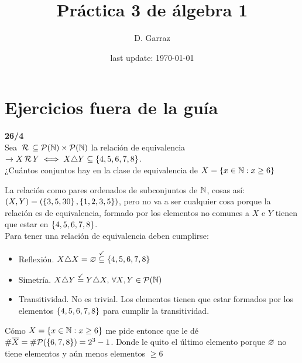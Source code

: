 \documentclass[12pt,a4paper, spanish]{article}
\begin{document}
\pagestyle{empty} %

\title{Práctica 3 de álgebra 1} %
\author{D. Garraz} %
\date{last update: \today} %
\section*{Ejercicios fuera de la guía}
\textbf{26/4}\\
Sea $\,\mathcal{R}\, \subseteq \mathcal P(\mathbb N) \times \mathcal P(\mathbb N)$ la relación de equivalencia $\to X \,\mathcal{R}\, Y \iff X \triangle Y \subseteq \left\{ 4,5,6,7,8 \right\}$.\\
¿Cuántos conjuntos hay en la clase de equivalencia de $X = \left\{ x \in \mathbb N : x \geq 6 \right\}$

\separadorCorto
La relación como pares ordenados de subconjuntos de $\mathbb N$, cosas así: $ (X,Y) = \left(  \left\{ 3, 5, 30 \right\}, \left\{ 1,2,3,5 \right\}  \right)$, pero no va a ser cualquier cosa
porque la relación es de equivalencia, formado por los elementos no comunes a $X$ e $Y$ tienen que estar en $\left\{ 4,5,6,7,8 \right\}$.\\
Para tener una relación de equivalencia deben cumplirse:

\begin{itemize}
	\item Reflexión. $X \triangle X = \varnothing \stackrel{\checkmark}\subseteq \left\{ 4,5,6,7,8 \right\}$

	\item Simetría. $X \triangle Y \stackrel{\checkmark}= Y \triangle X,\, \forall X,Y \in \mathcal P(\mathbb N)$ 

  \item Transitividad. No es trivial. Los elementos tienen que estar formados por los elementos $\left\{ 4,5,6,7,8 \right\}$ para cumplir la transitividad.\\
\end{itemize}

Cómo $X = \left\{ x \in \mathbb N : x \geq 6 \right\}$ me pide entonce que le dé $\#\overline X = \#\mathcal P(\left\{ 6,7,8 \right\}) = 2^3 - 1$. Donde le quito el último elemento porque $\varnothing$
no tiene elementos y aún menos elementos $\geq 6$
\end{document}
